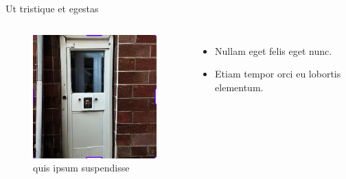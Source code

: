 \begin{frame}{Ut tristique et egestas}
    \begin{columns}
         \begin{figure}
        \centering
        \includegraphics[width=\linewidth]{images/image3.png}
        \caption{quis ipsum suspendisse\cite{lee_predicting_2022}}
        \label{fig:quis_ipsum_suspendisse}
    \end{figure}
    \begin{itemize}
        \item Nullam eget felis eget nunc\cite{mansfield_i_2021}. 
        \bigskip
        \item Etiam tempor orci eu lobortis elementum\cite{brauer_ill_2021}.
    \end{itemize}
    \end{columns}
    \vspace{-7pt}
\end{frame}


